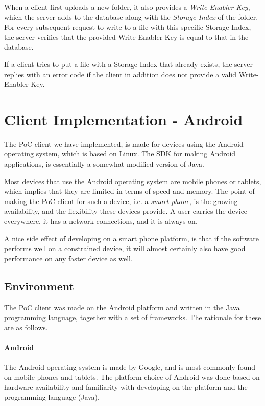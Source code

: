 \documentclass[pdftex,english,10pt,b5paper,twoside]{book}
\begin{document}
When a client first uploads a new folder, it also provides a
\emph{Write-Enabler Key}, which the server adds to the database along with the
\emph{Storage Index} of the folder.  For every subsequent request to write to a
file with this specific Storage Index, the server verifies that the provided
Write-Enabler Key is equal to that in the database.

If a client tries to put a file with a Storage Index that already exists, the
server replies with an error code if the client in addition does not provide a
valid Write-Enabler Key.

\section{Client Implementation - Android}

The \ac{PoC} client we have implemented, is made for devices using the Android
operating system, which is based on Linux. The \ac{SDK} for making Android
applications, is essentially a somewhat modified version of Java.

Most devices that use the Android operating system are mobile phones or
tablets, which implies that they are limited in terms of speed and
memory. The point of making the \ac{PoC} client for such a device, i.e. a
\emph{smart phone}, is the growing availability, and the flexibility these
devices provide. A user carries the device everywhere, it has a network
connections, and it is always on.

A nice side effect of developing on a smart phone platform, is that if the
software performs well on a constrained device, it will almost certainly also
have good performance on any faster device as well.

\subsection{Environment}

The \ac{PoC} client was made on the Android platform and written in the Java
programming language, together with a set of frameworks. The rationale for
these are as follows.

\paragraph{Android} The Android operating system is made by Google, and is most
commonly found on mobile phones and tablets. The platform choice of Android was
done based on hardware availability and familiarity with developing on the
platform and the programming language (Java).
\end{document}
